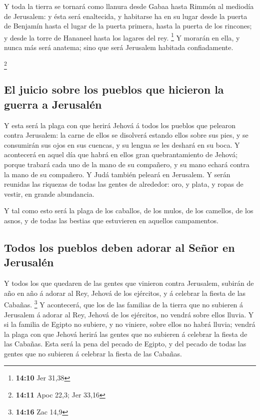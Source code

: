 Y toda la tierra se tornará como llanura desde Gabaa
hasta Rimmón al mediodía de Jerusalem: y ésta será enaltecida, y
habitarse ha en su lugar desde la puerta de Benjamín hasta el lugar de
la puerta primera, hasta la puerta de los rincones; y desde la torre de
Hananeel hasta los lagares del rey. \footnote{\textbf{14:10} Jer 31,38}
 Y morarán en ella, y nunca más será anatema; sino que
será Jerusalem habitada confiadamente.

\footnote{\textbf{14:11} Apoc 22,3; Jer 33,16}

\hypertarget{el-juicio-sobre-los-pueblos-que-hicieron-la-guerra-a-jerusaluxe9n}{%
\subsection{El juicio sobre los pueblos que hicieron la guerra a
Jerusalén}\label{el-juicio-sobre-los-pueblos-que-hicieron-la-guerra-a-jerusaluxe9n}}

 Y esta será la plaga con que herirá Jehová á todos los
pueblos que pelearon contra Jerusalem: la carne de ellos se disolverá
estando ellos sobre sus pies, y se consumirán sus ojos en sus cuencas, y
su lengua se les deshará en su boca.  Y acontecerá en
aquel día que habrá en ellos gran quebrantamiento de Jehová; porque
trabará cada uno de la mano de su compañero, y su mano echará contra la
mano de su compañero.  Y Judá también peleará en
Jerusalem. Y serán reunidas las riquezas de todas las gentes de
alrededor: oro, y plata, y ropas de vestir, en grande abundancia.

 Y tal como esto será la plaga de los caballos, de los
mulos, de los camellos, de los asnos, y de todas las bestias que
estuvieren en aquellos campamentos.

\hypertarget{todos-los-pueblos-deben-adorar-al-seuxf1or-en-jerusaluxe9n}{%
\subsection{Todos los pueblos deben adorar al Señor en
Jerusalén}\label{todos-los-pueblos-deben-adorar-al-seuxf1or-en-jerusaluxe9n}}

 Y todos los que quedaren de las gentes que vinieron
contra Jerusalem, subirán de año en año á adorar al Rey, Jehová de los
ejércitos, y á celebrar la fiesta de las Cabañas. \footnote{\textbf{14:16}
  Zac 14,9}  Y acontecerá, que los de las familias de la
tierra que no subieren á Jerusalem á adorar al Rey, Jehová de los
ejércitos, no vendrá sobre ellos lluvia.  Y si la familia
de Egipto no subiere, y no viniere, sobre ellos no habrá lluvia; vendrá
la plaga con que Jehová herirá las gentes que no subieren á celebrar la
fiesta de las Cabañas.  Esta será la pena del pecado de
Egipto, y del pecado de todas las gentes que no subieren á celebrar la
fiesta de las Cabañas.

